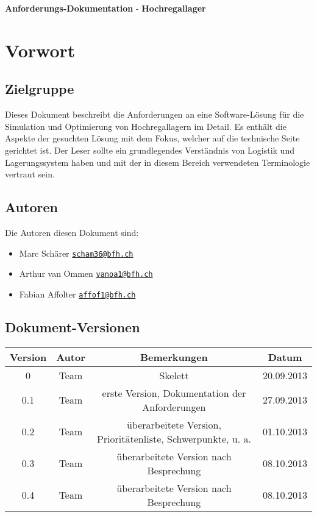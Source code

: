 \documentclass[11pt,a4paper]{article}
\begin{document}
{\huge \textbf{Anforderungs-Dokumentation}} - \textbf{Hochregallager} \\
\tableofcontents

\section{Vorwort}
%
\subsection{Zielgruppe}
Dieses Dokument beschreibt die Anforderungen an eine Software-Lösung für die Simulation und Optimierung von Hochregallagern im Detail. Es enthält die Aspekte der gesuchten Lösung mit dem Fokus, welcher auf die technische Seite gerichtet ist. Der Leser sollte ein grundlegendes Verständnis von Logistik und Lagerungssystem haben und mit der in diesem Bereich verwendeten Terminologie vertraut sein. 
%
\subsection{Autoren}
Die Autoren diesen Dokument sind:
%
\begin{itemize}
  \item Marc Schärer \href{mailto:scham36@bfh.ch}{\nolinkurl{scham36@bfh.ch}}
  \item Arthur van Ommen \href{mailto:vanoa1@bfh.ch}{\nolinkurl{vanoa1@bfh.ch}}
  \item Fabian Affolter \href{mailto:affof11@bfh.ch}{\nolinkurl{affof1@bfh.ch}}
\end{itemize}
%
\subsection{Dokument-Versionen}

\begin{table}[h]

  \begin{center}
    \begin{tabular}{|c|c|c|c|}
      \hline
      \textbf{Version} & \textbf{Autor} & \textbf{Bemerkungen} & Datum\\
      \hline
      0 & Team & Skelett & 20.09.2013\\
      0.1 & Team & erste Version, Dokumentation der Anforderungen &  27.09.2013 \\
      0.2 & Team & überarbeitete Version, Prioritätenliste, Schwerpunkte, u. a. & 01.10.2013 \\
      0.3 & Team & überarbeitete Version nach Besprechung & 08.10.2013 \\
      0.4 & Team & überarbeitete Version nach Besprechung & 08.10.2013 \\
      \hline
    \end{tabular}
  \end{center}
\end{table}
%
%
\end{document}
